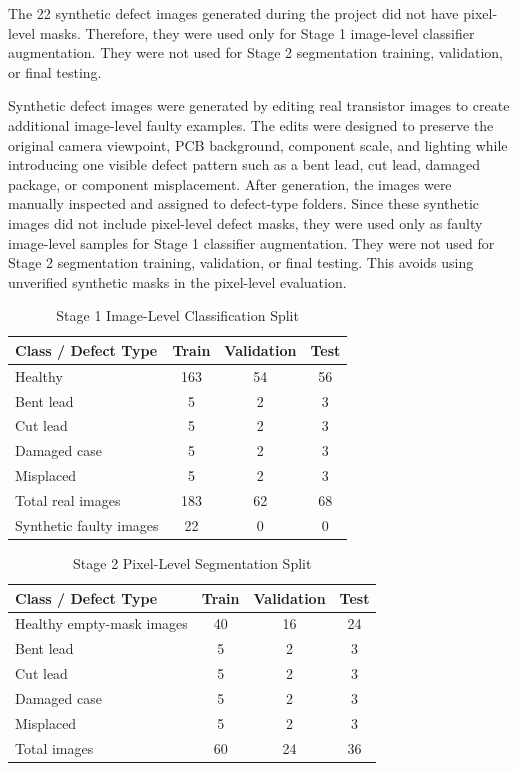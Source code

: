 \documentclass[conference,a4paper]{IEEEtran}
\begin{document}
The 22 synthetic defect images generated during the project did not have pixel-level masks. Therefore, they were used only for Stage 1 image-level classifier augmentation. They were not used for Stage 2 segmentation training, validation, or final testing.

Synthetic defect images were generated by editing real transistor images to create additional image-level faulty examples. The edits were designed to preserve the original camera viewpoint, PCB background, component scale, and lighting while introducing one visible defect pattern such as a bent lead, cut lead, damaged package, or component misplacement. After generation, the images were manually inspected and assigned to defect-type folders. Since these synthetic images did not include pixel-level defect masks, they were used only as faulty image-level samples for Stage 1 classifier augmentation. They were not used for Stage 2 segmentation training, validation, or final testing. This avoids using unverified synthetic masks in the pixel-level evaluation.

\begin{table}[!t]
\centering
\caption{Stage 1 Image-Level Classification Split}
\label{tab:stage1split}
\begin{tabular}{lccc}
\toprule
Class / Defect Type & Train & Validation & Test \\
\midrule
Healthy & 163 & 54 & 56 \\
Bent lead & 5 & 2 & 3 \\
Cut lead & 5 & 2 & 3 \\
Damaged case & 5 & 2 & 3 \\
Misplaced & 5 & 2 & 3 \\
\midrule
Total real images & 183 & 62 & 68 \\
Synthetic faulty images & 22 & 0 & 0 \\
\bottomrule
\end{tabular}
\end{table}

\begin{table}[!t]
\centering
\caption{Stage 2 Pixel-Level Segmentation Split}
\label{tab:stage2split}
\begin{tabular}{lccc}
\toprule
Class / Defect Type & Train & Validation & Test \\
\midrule
Healthy empty-mask images & 40 & 16 & 24 \\
Bent lead & 5 & 2 & 3 \\
Cut lead & 5 & 2 & 3 \\
Damaged case & 5 & 2 & 3 \\
Misplaced & 5 & 2 & 3 \\
\midrule
Total images & 60 & 24 & 36 \\
\bottomrule
\end{tabular}
\end{table}
\end{document}
